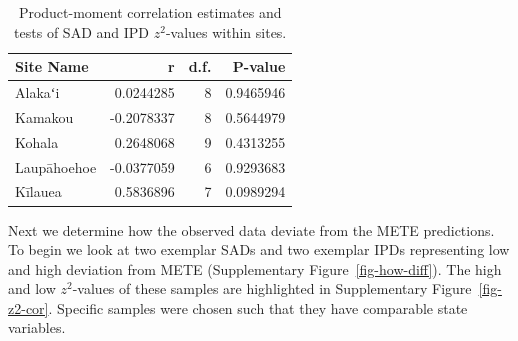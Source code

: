 \documentclass[
  letterpaper,
  DIV=11,
  numbers=noendperiod]{scrartcl}
\newenvironment{Shaded}{\begin{snugshade}}{\end{snugshade}}
\newcommand{\AttributeTok}[1]{\textcolor[rgb]{0.40,0.45,0.13}{#1}}
\newcommand{\CommentTok}[1]{\textcolor[rgb]{0.37,0.37,0.37}{#1}}
\newcommand{\ControlFlowTok}[1]{\textcolor[rgb]{0.00,0.23,0.31}{\textbf{#1}}}
\newcommand{\FunctionTok}[1]{\textcolor[rgb]{0.28,0.35,0.67}{#1}}
\newcommand{\NormalTok}[1]{\textcolor[rgb]{0.00,0.23,0.31}{#1}}
\newcommand{\OtherTok}[1]{\textcolor[rgb]{0.00,0.23,0.31}{#1}}
\newcommand{\SpecialCharTok}[1]{\textcolor[rgb]{0.37,0.37,0.37}{#1}}
\newcommand{\StringTok}[1]{\textcolor[rgb]{0.13,0.47,0.30}{#1}}
\begin{document}
\begin{Shaded}
\end{Shaded}

\begin{longtable}[]{@{}lrrr@{}}

\caption{\label{tbl-z2-cor-site}Product-moment correlation estimates and
tests of SAD and IPD \(z^2\)-values within sites.}

\tabularnewline

\toprule\noalign{}
Site Name & r & d.f. & P-value \\
\midrule\noalign{}
\endhead
\bottomrule\noalign{}
\endlastfoot
Alakaʻi & 0.0244285 & 8 & 0.9465946 \\
Kamakou & -0.2078337 & 8 & 0.5644979 \\
Kohala & 0.2648068 & 9 & 0.4313255 \\
Laupāhoehoe & -0.0377059 & 6 & 0.9293683 \\
Kīlauea & 0.5836896 & 7 & 0.0989294 \\

\end{longtable}

Next we determine how the observed data deviate from the METE
predictions. To begin we look at two exemplar SADs and two exemplar IPDs
representing low and high deviation from METE (Supplementary
Figure~\ref{fig-how-diff}). The high and low \(z^2\)-values of these
samples are highlighted in Supplementary Figure~\ref{fig-z2-cor}.
Specific samples were chosen such that they have comparable state
variables.
\end{document}
